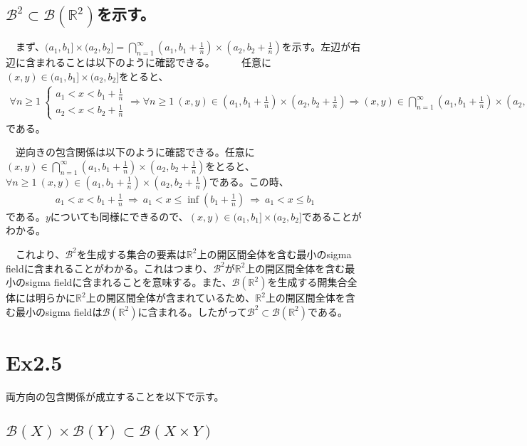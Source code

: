 \documentclass{article}
\begin{document}
\subsection{$\mathcal{B}^2 \subset \mathcal{B} \left(\mathbb{R}^2 \right)$を示す。}
　まず、$(a_1, b_1] \times(a_2,b_2] = \bigcap_{n=1}^{\infty} (a_1, b_1+\frac{1}{n}) \times(a_2, b_2+\frac{1}{n})$を示す。左辺が右辺に含まれることは以下のように確認できる。
　
　任意に$(x,y) \in (a_1, b_1] \times(a_2,b_2]$をとると、
\begin{align*}
	\forall n\geq1\ \begin{cases}
	a_1 < x < b_1 + \frac{1}{n}\\
	a_2 < x < b_2 + \frac{1}{n}
	\end{cases}
	\Rightarrow
	\forall n\geq1\ (x,y)\in (a_1, b_1+\frac{1}{n})\times(a_2,b_2+\frac{1}{n})
	\Rightarrow
	(x, y)\in \bigcap_{n=1}^{\infty} (a_1, b_1+\frac{1}{n}) \times(a_2, b_2+\frac{1}{n})
\end{align*}
である。

　逆向きの包含関係は以下のように確認できる。任意に$(x,y) \in \bigcap_{n=1}^{\infty} (a_1, b_1+\frac{1}{n}) \times(a_2, b_2+\frac{1}{n})$をとると、$\forall n\geq1\ (x,y)\in (a_1, b_1+\frac{1}{n}) \times(a_2, b_2+\frac{1}{n})$である。この時、
\begin{align*}
	a_1 <x< b_1+\frac{1}{n}\ \Rightarrow\ a_1 < x \leq \inf \left(b_1 + \frac{1}{n}\right)\ \Rightarrow\ a_1 < x \leq b_1
\end{align*}
である。$y$についても同様にできるので、$(x,y) \in (a_1, b_1] \times(a_2,b_2]$であることがわかる。

　これより、$\mathcal{B}^2$を生成する集合の要素は$\mathbb{R}^2$上の開区間全体を含む最小のsigma fieldに含まれることがわかる。これはつまり、$\mathcal{B}^2$が$\mathbb{R}^2$上の開区間全体を含む最小のsigma fieldに含まれることを意味する。また、$\mathcal{B} \left(\mathbb{R}^2 \right)$を生成する開集合全体には明らかに$\mathbb{R}^2$上の開区間全体が含まれているため、$\mathbb{R}^2$上の開区間全体を含む最小のsigma fieldは$\mathcal{B} \left(\mathbb{R}^2 \right)$に含まれる。したがって$\mathcal{B}^2 \subset \mathcal{B} \left(\mathbb{R}^2 \right)$である。



\section{Ex2.5}
両方向の包含関係が成立することを以下で示す。

\subsection{$\mathcal{B}(X)\times\mathcal{B}(Y) \subset \mathcal{B}(X\times Y)$}
\end{document}
